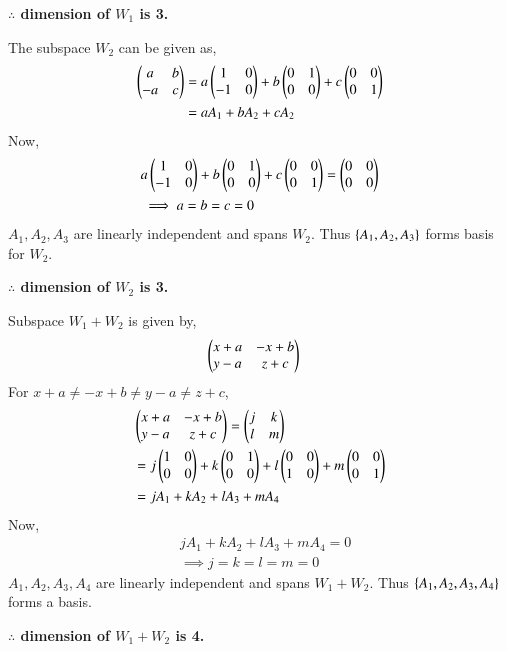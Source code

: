 \documentclass[journal,12pt,twocolumn]{IEEEtran}
\begin{document}
\begin{enumerate}
\textbf{$\therefore$ dimension of $W_1$ is 3.}   

The subspace $W_2$ can be given as, 
\begin{align}
    \begin{pmatrix}a&b\\-a&c\end{pmatrix} &= a\begin{pmatrix}1&0\\-1&0\end{pmatrix} + b\begin{pmatrix}0&1\\0&0\end{pmatrix} + c\begin{pmatrix}0&0\\0&1\end{pmatrix} \\
    &= aA_1 + bA_2 + cA_2 \label{span_w2}
\end{align}
Now, 
\begin{align}
    &a\begin{pmatrix}1&0\\-1&0\end{pmatrix} + b\begin{pmatrix}0&1\\0&0\end{pmatrix} + c\begin{pmatrix}0&0\\0&1\end{pmatrix} = \begin{pmatrix}0&0\\0&0\end{pmatrix} \\
    &\implies a = b = c = 0 \label{indep_w2}
\end{align}
$A_1, A_2, A_3$ are linearly independent and spans $W_2$. Thus $\left\{A_1, A_2, A_3\right\}$ forms basis for $W_2$. 

\textbf{$\therefore$ dimension of $W_2$ is 3.}

Subspace $W_1+W_2$ is given by, 
\begin{align}
    &\begin{pmatrix}x+a&-x+b\\y-a&z+c\end{pmatrix}
\end{align}
For $x+a\ne -x+b\ne y-a\ne z+c $, 
\begin{align}
    &\begin{pmatrix}x+a&-x+b\\y-a&z+c\end{pmatrix} = \begin{pmatrix}j&k\\l&m\end{pmatrix} \\
    &= j\begin{pmatrix}1&0\\0&0\end{pmatrix}+k\begin{pmatrix}0&1\\0&0\end{pmatrix}+l\begin{pmatrix}0&0\\1&0\end{pmatrix} + m\begin{pmatrix}0&0\\0&1\end{pmatrix} \\
    &= jA_1 + kA_2 + lA_3 + mA_4
\end{align}
Now, 
\begin{align}
    &jA_1 + kA_2 + lA_3 + mA_4 = 0 \\
    &\implies j=k=l=m=0
\end{align}
$A_1, A_2, A_3, A_4 $ are linearly independent and spans $W_1+W_2$. 
Thus $\left\{A_1, A_2, A_3, A_4\right\}$ forms a basis. 

\textbf{$\therefore$ dimension of $W_1+W_2$ is 4.}


\end{enumerate}
\end{document}
